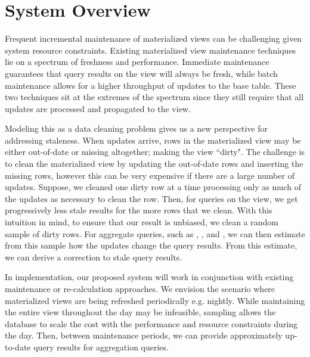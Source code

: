 \section{System Overview}\label{sec-arch}
Frequent incremental maintenance of materialized views can be challenging given system resource constraints.
Existing materialized view maintenance techniques lie on a spectrum of freshness and performance.
Immediate maintenance guarantees that query results on the view will always be fresh, while batch maintenance allows for a higher throughput of updates to the base table.
These two techniques sit at the extremes of the spectrum since they still require that all updates are processed and propagated to the view.

Modeling this as a data cleaning problem gives us a new perspective for addressing staleness.
When updates arrive, rows in the materialized view may be either out-of-date or missing altogether; making the view ``dirty".
The challenge is to clean the materialized view by updating the out-of-date rows and inserting the missing rows, however this can be very expensive if there are a large number of updates.
Suppose, we cleaned one dirty row at a time processing only as much of the updates as necessary to clean the row.
Then, for queries on the view, we get progressively less stale results for the more rows that we clean.
With this intuition in mind, to ensure that our result is unbiased, we clean a random sample of dirty rows.
For aggregate queries, such as \sumfunc, \countfunc, and \avgfunc, we can then estimate from this sample how the updates change the query results.
From this estimate, we can derive a correction to stale query results.


In implementation, our proposed system will work in conjunction with existing maintenance or re-calculation approaches.
We envision the scenario where materialized views are being refreshed periodically e.g. nightly.
While maintaining the entire view throughout the day may be infeasible, sampling allows the database to scale the cost with the performance and resource constraints during the day.
Then, between maintenance periods, we can provide approximately up-to-date query results for aggregation queries.

